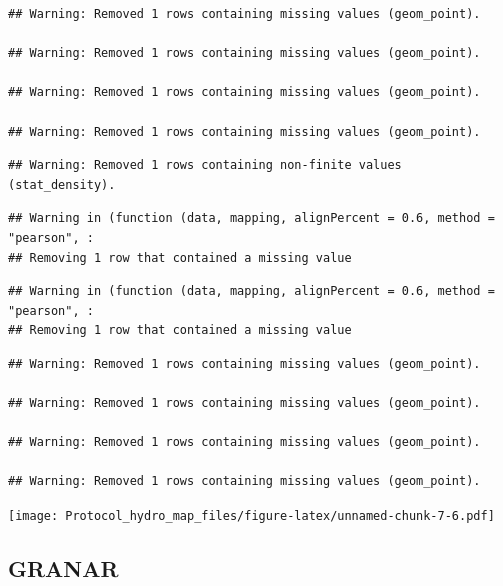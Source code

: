\documentclass[]{article}
\begin{document}
\begin{verbatim}
## Warning: Removed 1 rows containing missing values (geom_point).

## Warning: Removed 1 rows containing missing values (geom_point).

## Warning: Removed 1 rows containing missing values (geom_point).

## Warning: Removed 1 rows containing missing values (geom_point).
\end{verbatim}

\begin{verbatim}
## Warning: Removed 1 rows containing non-finite values (stat_density).
\end{verbatim}

\begin{verbatim}
## Warning in (function (data, mapping, alignPercent = 0.6, method = "pearson", :
## Removing 1 row that contained a missing value
\end{verbatim}

\begin{verbatim}
## Warning in (function (data, mapping, alignPercent = 0.6, method = "pearson", :
## Removing 1 row that contained a missing value
\end{verbatim}

\begin{verbatim}
## Warning: Removed 1 rows containing missing values (geom_point).

## Warning: Removed 1 rows containing missing values (geom_point).

## Warning: Removed 1 rows containing missing values (geom_point).

## Warning: Removed 1 rows containing missing values (geom_point).
\end{verbatim}

\texttt{[image: Protocol\_hydro\_map\_files/figure-latex/unnamed-chunk-7-6.pdf]}

\subsection{GRANAR}\label{granar}
\end{document}
